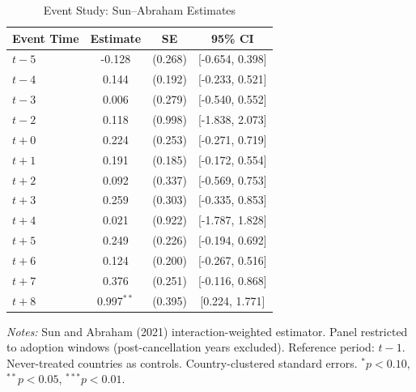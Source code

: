 \begin{table}[t]
\centering
\caption{Event Study: Sun--Abraham Estimates}
\label{tab:eventstudy}
\begin{tabular}{lccc}
\toprule
Event Time & Estimate & SE & 95\% CI \\
\midrule
$t  -5$ & -0.128 & (0.268) & [-0.654, 0.398] \\
$t  -4$ & 0.144 & (0.192) & [-0.233, 0.521] \\
$t  -3$ & 0.006 & (0.279) & [-0.540, 0.552] \\
$t  -2$ & 0.118 & (0.998) & [-1.838, 2.073] \\
$t + 0$ & 0.224 & (0.253) & [-0.271, 0.719] \\
$t + 1$ & 0.191 & (0.185) & [-0.172, 0.554] \\
$t + 2$ & 0.092 & (0.337) & [-0.569, 0.753] \\
$t + 3$ & 0.259 & (0.303) & [-0.335, 0.853] \\
$t + 4$ & 0.021 & (0.922) & [-1.787, 1.828] \\
$t + 5$ & 0.249 & (0.226) & [-0.194, 0.692] \\
$t + 6$ & 0.124 & (0.200) & [-0.267, 0.516] \\
$t + 7$ & 0.376 & (0.251) & [-0.116, 0.868] \\
$t + 8$ & 0.997$^{**}$ & (0.395) & [0.224, 1.771] \\
\bottomrule
\end{tabular}
\begin{tablenotes}
\small
\item \textit{Notes:} Sun and Abraham (2021) interaction-weighted estimator. Panel restricted to adoption windows (post-cancellation years excluded). Reference period: $t - 1$. Never-treated countries as controls. Country-clustered standard errors. $^{*}p<0.10$, $^{**}p<0.05$, $^{***}p<0.01$.
\end{tablenotes}
\end{table}
